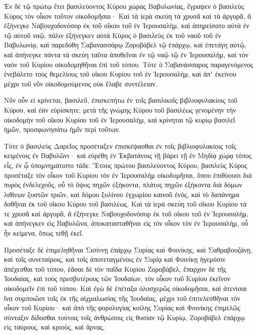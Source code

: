 {\par }{\PP {}Ἐν δὲ τῷ πρώτῳ ἔτει βασιλεύοντος Κύρου χώρας Βαβυλωνίας, ἔγραψεν ὁ βασιλεὺς Κύρος τὸν οἶκον τοῦτον οἰκοδομῆσαι·
Καὶ τὰ ἱερὰ σκεύη τὰ χρυσᾶ καὶ τὰ ἀργυρᾶ, ἃ ἐξήνεγκε Ναβουχοδονόσορ ἐκ τοῦ οἴκου τοῦ ἐν Ἱερουσαλὴμ, καὶ ἀπηρείσατο αὐτὰ ἐν τῷ αὐτοῦ ναῷ, πάλιν ἐξήνεγκεν αὐτὰ Κύρος ὁ βασιλεὺς ἐκ τοῦ ναοῦ τοῦ ἐν Βαβυλωνίᾳ, καὶ παρεδόθη Σαβανασσάρῳ Ζοροβάβελ τῷ ἐπάρχῳ,
καὶ ἐπετάγη αὐτῷ, καὶ ἀπήνεγκε πάντα τὰ σκεύη ταῦτα ἀποθεῖναι ἐν τῷ ναῷ τῷ ἐν Ἱερουσαλὴμ, καὶ τὸν ναὸν τοῦ Κυρίου οἰκοδομηθῆναι ἐπὶ τοῦ τόπου.
Τότε ὁ Σαβανάσσαρος παραγενόμενος ἐνεβάλετο τοὺς θεμελίους τοῦ οἴκου Κυρίου τοῦ ἐν Ἱερουσαλὴμ, καὶ ἀπʼ ἐκείνου μέχρι τοῦ νῦν οἰκοδομούμενος οὐκ ἔλαβε συντέλειαν.
\par }{\PP {}Νῦν οὖν εἰ κρίνεται, βασιλεῦ, ἐπισκεπήτω ἐν τοῖς βασιλικοῖς βιβλιοφυλακίοις τοῦ Κύρου,
καὶ ἐὰν εὑρίσκητε; μετὰ τῆς γνώμης Κύρου τοῦ βασιλέως γενομένην τὴν οἰκοδομὴν τοῦ οἴκου Κυρίου τοῦ ἐν Ἱερουσαλὴμ, καὶ κρίνηται τῷ κυρίῳ βασιλεῖ ἡμῶν, προσφωνησάτω ἡμῖν περὶ τοῦτων.
\par }{\PP {}Τότε ὁ βασιλεὺς Δαρεῖος προσέταξεν ἐπισκέψασθαι ἐν τοῖς βιβλιοφυλακίοις τοῖς κειμένοις ἐν Βαβυλῶνι· καὶ εὑρέθη ἐν Ἐκβατάνοις τῇ βάρει τῇ ἐν Μηδίᾳ χώρᾳ τόπος εἷς, ἐν ᾧ ὑπομνημάτιστο τάδε.
Ἔτους πρώτου βασιλεύοντος Κύρου, βασιλεὺς Κύρος προσέταξε τὸν οἶκον τοῦ Κυρίου τὸν ἐν Ἱερουσαλὴμ οἰκοδομῆσαι, ὅπου ἐπιθύουσι διὰ πυρὸς ἐνδελεχοῦς, οὗ τὸ ὕψος πηχῶν ἑξήκοντα,
πλάτος πηχῶν ἑξήκοντα διὰ δόμων λιθίνων ξυστῶν τριῶν, καὶ δόμου ξυλίνου ἐγχωρίου καινοῦ ἑνὸς, καὶ τὸ δαπάνημα δοθῆναι ἐκ τοῦ οἴκου Κύρου τοῦ βασιλέως.
Καὶ τὰ ἱερὰ σκεύη τοῦ οἴκου Κυρίου τά τε χρυσᾶ καὶ ἀργυρᾶ, ἃ ἐξήνεγκε Ναβουχοδονόσορ ἐκ τοῦ οἴκου τοῦ ἐν Ἱερουσαλὴμ, καὶ ἀπήνεγκεν εἰς Βαβυλῶνα, ἀποκατασταθῆναι εἰς τὸν οἶκον τὸν ἐν Ἱερουσαλὴμ, οὗ ἦν κείμενα, ὅπως τεθῇ ἐκεῖ.
\par }{\PP {}Προσέταξε δὲ ἐπιμεληθῆναι Σισίννῃ ἐπάρχῳ Συρίας καὶ Φοινίκης, καὶ Σαθραβουζάνῃ, καὶ τοῖς συνεταίροις, καὶ τοῖς ἀποτεταγμένοις ἐν Συρίᾳ καὶ Φοινίκῃ ἡγεμόσιν ἀπέχεσθαι τοῦ τόπου, ἐᾶσαι δὲ τὸν παῖδα Κυρίου Ζοροβάβελ, ἔπαρχον δὲ τῆς Ἰουδαίας, καὶ τοὺς πρεσβυτέρους τῶν Ἰουδαίων, τὸν οἶκον τοῦ Κυρίου ἐκεῖνον οἰκοδομεῖν ἐπὶ τοῦ τόπου.
Καὶ ἐγὼ δὲ ἐπέταξα ὁλοσχερῶς οἰκοδομῆσαι, καὶ ἀτενίσαι ἵνα συμποιῶσι τοῖς ἐκ τῆς αἰχμαλωσίας τῆς Ἰουδαίας, μέχρι τοῦ ἐπιτελεσθῆναι τὸν οἶκον τοῦ Κυρίου·
καὶ ἀπὸ τῆς φορολογίας κοίλης Συρίας καὶ Φοινίκης ἐπιμελῶς σύνταξιν δίδοσθαι τούτοις τοῖς ἀνθρώποις εἰς θυσίαν τῷ Κυρίῳ, Ζοροβάβελ ἐπάρχῳ εἰς ταύρους, καὶ κριοὺς, καὶ ἄρνας,
}
